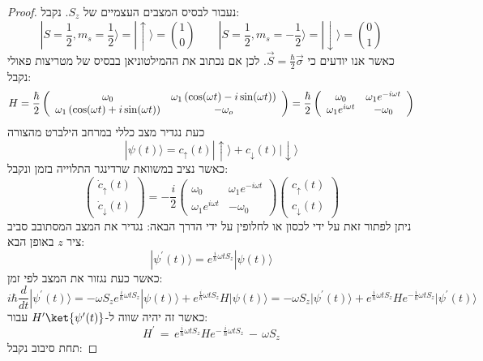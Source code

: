 \documentclass{tstextbook}
\begin{document}
\begin{proof}
נעבור לבסיס המצבים העצמיים של \(S_{z}\). נקבל:
$$|S={\frac{1}{2}},m_{s}={\frac{1}{2}}\rangle=|\uparrow\rangle={\binom{1}{0}}\qquad|S={\frac{1}{2}},m_{s}=-{\frac{1}{2}}\rangle=|\downarrow\rangle={\binom{0}{1}}$$
כאשר אנו יודעים כי \(\vec{S}=\frac{\hbar}{2}\vec{\sigma}\). לכן אם נכתוב את ההמילטוניאן בבסיס של מטריצות פאולי נקבל:
$$H=\frac{\hbar}{2}\left(\begin{array}{c c}{{\omega_{0}}}&{{\omega_{1}\left(\cos(\omega t)-i\sin(\omega t)\right)}}\\ {{\omega_{1}\left(\cos(\omega t)+i\sin(\omega t)\right)}}&{{-\omega_{o}}}\end{array}\right)=\frac{\hbar}{2}\left(\begin{array}{c c}{{\omega_{0}}}&{{\omega_{1}e^{-i\omega t}}}\\ {{\omega_{1}e^{i\omega t}}}&{{-\omega_{0}}}\end{array}\right)$$
כעת נגדיר מצב כללי במרחב הילברט מהצורה $$|\psi(t)\rangle=c_{\uparrow}(t)|\uparrow\rangle+c_{\downarrow}(t)|\downarrow\rangle$$
כאשר נציב במשוואת שרדינגר התלוייה בזמן ונקבל:
$$\begin{pmatrix}\dot{c}_{\uparrow}(t)\\ \dot{c}_{\downarrow}(t)\end{pmatrix}=-\frac{i}{2}\begin{pmatrix}\omega_{0}&\omega_{1}e^{-i\omega t}\\ \omega_{1}e^{i\omega t}&-\omega_{0}\end{pmatrix}\begin{pmatrix}c_{\uparrow}(t)\\ c_{\downarrow}(t)\end{pmatrix}$$
ניתן לפתור זאת על ידי לכסון או לחלופין על ידי הדרך הבאה:
נגדיר את המצב המסתובב סביב ציר \(z\) באופן הבא:
$$|\psi^{\prime}(t)\rangle=e^{\frac{i}{\hbar}\omega t S_{z}}|\psi(t)\rangle$$
כאשר כעת נגזור את המצב לפי זמן:
$$i\hbar{\frac{d}{d t}}|\psi^{\prime}(t)\rangle=-\omega S_{z}e^{{\frac{i}{\hbar}}\omega t S_{z}}|\psi(t)\rangle+e^{{\frac{i}{\hbar}}\omega t S_{z}}H|\psi(t)\rangle=-\omega S_{z}|\psi^{\prime}(t)\rangle+e^{{\frac{i}{\hbar}}\omega t S_{z}}H e^{-{\frac{i}{\hbar}}\omega t S_{z}}|\psi^{\prime}(t)\rangle$$
כאשר זה יהיה שווה ל-\(H'\ket{\psi'(t)}\) עבור:
$$H^{\prime}\,=\,e^{\frac{i}{\hbar}\omega t S_{z}}H e^{-\,\frac{i}{\hbar}\omega t S_{z}}\,-\,\omega S_{z}$$
תחת סיבוב נקבל:

\end{proof}
\end{document}
